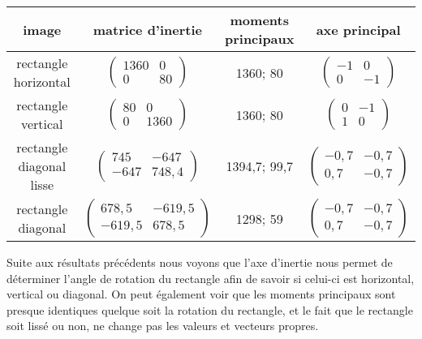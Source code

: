 \documentclass{article}
\begin{document}
  \begin{center}
    \begin{tabular}{|c|c|c|c|}
      \hline
      \textbf{image} & \textbf{matrice d'inertie} & \textbf{moments principaux} & \textbf{axe principal} \\
      \hline
      rectangle horizontal & $\begin{pmatrix}
			      1360 & 0 \\
			      0 & 80 
			      \end{pmatrix}$ 
			  & 1360; 80
			  &  $\begin{pmatrix}
			      -1 & 0 \\
			      0 & -1 
			      \end{pmatrix}$\\
      \hline
      rectangle vertical & $\begin{pmatrix}
			      80 & 0 \\
			      0 & 1360 
			      \end{pmatrix}$
			  & 1360; 80
			  &  $\begin{pmatrix}
			      0 & -1 \\
			      1 & 0 
			      \end{pmatrix}$\\
      \hline
      rectangle diagonal lisse & $\begin{pmatrix}
			      745 & -647 \\
			      -647 & 748,4 
			      \end{pmatrix}$
			  & 1394,7; 99,7
			  &  $\begin{pmatrix}
			      -0,7 & -0,7 \\
			      0,7 & -0,7 
			      \end{pmatrix}$\\
      \hline
      rectangle diagonal & $\begin{pmatrix}
			      678,5 & -619,5 \\
			      -619,5 & 678,5 
			      \end{pmatrix}$
			  & 1298; 59
			  &  $\begin{pmatrix}
			      -0,7 & -0,7 \\
			      0,7 & -0,7 
			      \end{pmatrix}$\\
      \hline
    \end{tabular}
  \end{center}
  
  Suite aux résultats précédents nous voyons que l'axe d'inertie nous permet de déterminer 
  l'angle de rotation du rectangle afin de savoir si celui-ci est horizontal, vertical ou diagonal. 
  On peut également voir que les moments principaux sont presque identiques quelque soit la rotation 
  du rectangle, et le fait que le rectangle soit lissé ou non, ne change pas les valeurs et vecteurs 
  propres.\\
  
\end{document}
